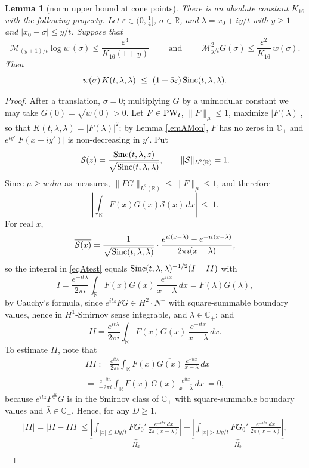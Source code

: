 \documentclass[11pt,twoside,reqno]{amsart}
\def\PW{\text{\rm PW}}
\def\R{{\mathbb R}}
\def\C{{\mathbb{C}}}
\def\MM{{\mathcal M}}
\def\SS{{\mathcal S}}
\def\e{\varepsilon}
\def\l{\lambda}
\def\s{\sigma}
\def\S{\text{\rm Sinc}}
\theoremstyle{plain}
\newtheorem{lemma}{Lemma}
\numberwithin{equation}{section}
\begin{document}
\begin{lemma}[norm upper bound at cone points]\label{lemAUp}
There is an absolute constant $K_{16}$ with the following property. Let $\e\in(0,\tfrac14]$, $\s\in\R$, and $\l=x_0+iy/t$ with $y\geq1$ and $|x_0-\s|\leq y/t$. Suppose that
\begin{equation}
\MM_{(y+1)/t}\log w\,(\s)\leq\frac{\e^4}{K_{16}(1+y)}
\qquad\text{ and }\qquad
\MM^2_{y/t}G(\s)\leq\frac{\e^2}{K_{16}}\,w(\s).
\label{eqAupHyp}
\end{equation}
Then
$$w(\s)\,K(t,\l,\l)\ \leq\ (1+5\e)\,\S(t,\l,\l) .$$
\end{lemma}

\begin{proof}
After a translation, $\s=0$; multiplying $G$ by a unimodular constant we may take $G(0)=\sqrt{w(0)}>0$. Let $F\in\PW_t$, $\|F\|_\mu\leq1$, maximize $|F(\l)|$, so that $K(t,\l,\l)=|F(\l)|^2$; by Lemma \ref{lemAMon}, $F$ has no zeros in $\C_+$ and $e^{ty'}|F(x+iy')|$ is non-decreasing in $y'$. Put
$$\SS(z)=\frac{\S(t,\l,z)}{\sqrt{\S(t,\l,\l)}},\qquad \|\SS\|_{L^2(\R)}=1 .$$
Since $\mu\geq w\,dm$ as measures, $\|FG\|_{L^2(\R)}\leq\|F\|_\mu\leq1$, and therefore
\begin{equation}
\left|\int_\R F(x)G(x)\overline{\SS(x)}\,dx\right|\ \leq\ 1 .
\label{eqAtest}
\end{equation}
For real $x$,
$$\overline{\SS(x)}=\frac1{\sqrt{\S(t,\l,\l)}}\cdot\frac{e^{it(x-\l)}-e^{-it(x-\l)}}{2\pi i(x-\l)},$$
so the integral in \eqref{eqAtest} equals $\S(t,\l,\l)^{-1/2}(I-II)$ with
$$I=\frac{e^{-it\l}}{2\pi i}\int_\R F(x)G(x)\,\frac{e^{itx}}{x-\l}\,dx=F(\l)G(\l),$$
by Cauchy's formula, since $e^{itz}FG\in H^2\cdot N^+$ with square-summable boundary values, hence in $H^1$-Smirnov sense integrable, and $\l\in\C_+$; and
$$II=\frac{e^{it\l}}{2\pi i}\int_\R F(x)G(x)\,\frac{e^{-itx}}{x-\l}\,dx .$$
To estimate $II$, note that
$$\begin{gathered}III:=\frac{e^{it\l}}{2\pi i}\int_\R F(x)\overline{G(x)}\,\frac{e^{-itx}}{x-\l}\,dx=\\
=\overline{\ \frac{e^{-it\bar\l}}{-2\pi i}\int_\R \overline{F(x)}\,G(x)\,\frac{e^{itx}}{x-\bar\l}\,dx\ }=0,\end{gathered}$$
because $e^{itz}F^\#G$ is in the Smirnov class of $\C_+$ with square-summable boundary values and $\bar\l\in\C_-$. Hence, for any $D\geq1$,
$$\begin{gathered}|II|=|II-III|\leq
\underbrace{\left|\int_{|x|\leq Dy/t}\!\!FG_0'\,\frac{e^{-itx}\,dx}{2\pi(x-\l)}\right|}_{II_a}
+\underbrace{\left|\int_{|x|>Dy/t}\!\!FG_0'\,\frac{e^{-itx}\,dx}{2\pi(x-\l)}\right|}_{II_b},\\

\end{gathered}$$
\end{proof}
\end{document}

